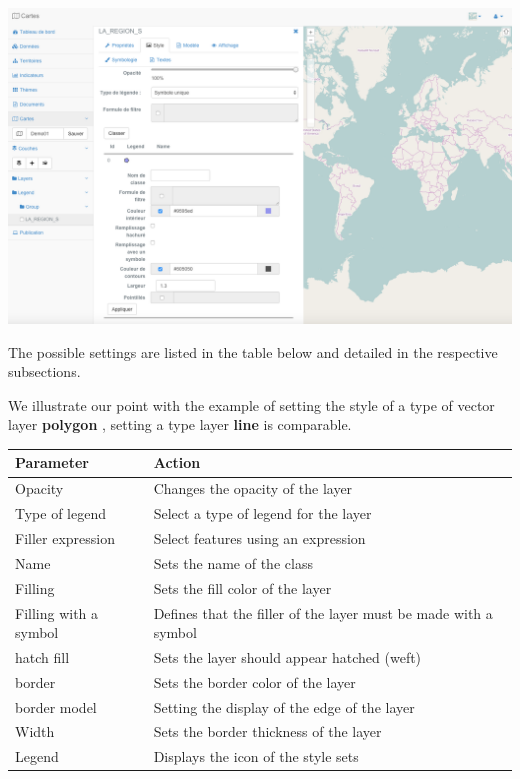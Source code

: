 \documentclass[letterpaper,10pt,english]{sphinxmanual}
\begin{document}
\includegraphics[width=1.000\linewidth]{set-style-window.png}

The possible settings are listed in the table below and detailed in the respective subsections.

We illustrate our point with the example of setting the style of a type of vector layer \textbf{polygon} , setting a type layer \textbf{line} is comparable.

\begin{tabulary}{\linewidth}{|L|L|}
\hline

\textbf{Parameter}
 & 
\textbf{Action}
\\
\hline
Opacity
 & 
Changes the opacity of the layer
\\
\hline
Type of legend
 & 
Select a type of legend for the layer
\\
\hline
Filler expression
 & 
Select features using an expression
\\
\hline
Name
 & 
Sets the name of the class
\\
\hline
Filling
 & 
Sets the fill color of the layer
\\
\hline
Filling with a symbol
 & 
Defines that the filler of the layer must be made with a symbol
\\
\hline
hatch fill
 & 
Sets the layer should appear hatched (weft)
\\
\hline
border
 & 
Sets the border color of the layer
\\
\hline
border model
 & 
Setting the display of the edge of the layer
\\
\hline
Width
 & 
Sets the border thickness of the layer
\\
\hline
Legend
 & 
Displays the icon of the style sets
\\
\hline\end{tabulary}
\end{document}
